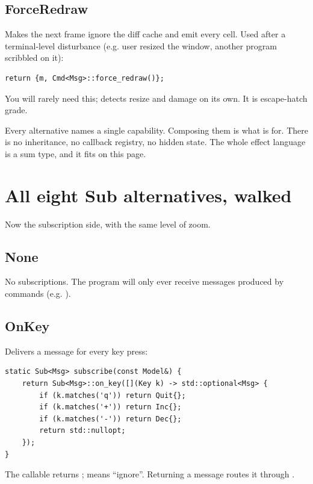 \subsection*{ForceRedraw}

Makes the next frame ignore the diff cache and emit every cell.
Used after a terminal-level disturbance (e.g. user resized the
window, another program scribbled on it):

\begin{lstlisting}
return {m, Cmd<Msg>::force_redraw()};
\end{lstlisting}

You will rarely need this; \maya{} detects resize and damage on
its own. It is escape-hatch grade.

\begin{recap}
Every  alternative names a single capability. Composing
them is what  is for. There is no inheritance, no
callback registry, no hidden state. The whole effect language is a
sum type, and it fits on this page.
\end{recap}

\section{All eight Sub alternatives, walked}

Now the subscription side, with the same level of zoom.

\subsection*{None}

No subscriptions. The program will only ever receive messages
produced by commands (e.g. ).

\subsection*{OnKey}

Delivers a message for every key press:

\begin{lstlisting}
static Sub<Msg> subscribe(const Model&) {
    return Sub<Msg>::on_key([](Key k) -> std::optional<Msg> {
        if (k.matches('q')) return Quit{};
        if (k.matches('+')) return Inc{};
        if (k.matches('-')) return Dec{};
        return std::nullopt;
    });
}
\end{lstlisting}

The callable returns ; 
means ``ignore''. Returning a message routes it through
.


